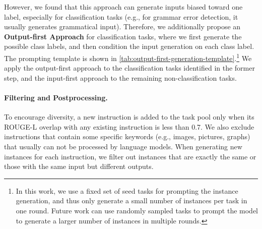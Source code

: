 \documentclass[11pt]{article}
\newcommand{\daniel}[1]{\textcolor{blue}{[DK: #1]}}
\begin{document}
However, we found that this approach can generate inputs biased toward one label, especially for classification tasks (e.g., for grammar error detection, it usually generates grammatical input). Therefore, we additionally propose an
\textbf{Output-first Approach} for classification tasks, where we first generate the possible class labels, and then condition the input generation on each class label. The prompting template is shown in \autoref{tab:output-first-generation-template}.\footnote{In this work, we use a fixed set of seed tasks for prompting the instance generation, and thus only generate a small number of instances per task in one round. Future work can use randomly sampled tasks to prompt the model to generate a larger number of instances in multiple rounds.} We apply the output-first approach to the classification tasks identified in the former step, and the input-first approach to the remaining non-classification tasks.


\paragraph{Filtering and Postprocessing.}
\label{subsec:filtering}
To encourage diversity, a new instruction is added to the task pool only when its ROUGE-L overlap with any existing instruction is less than 0.7. 
We also exclude instructions that contain some specific keywords (e.g., images, pictures, graphs) that usually can not be processed by language models. When generating new instances for each instruction, we filter out instances that are exactly the same or those with the same input but different outputs.  



\end{document}
